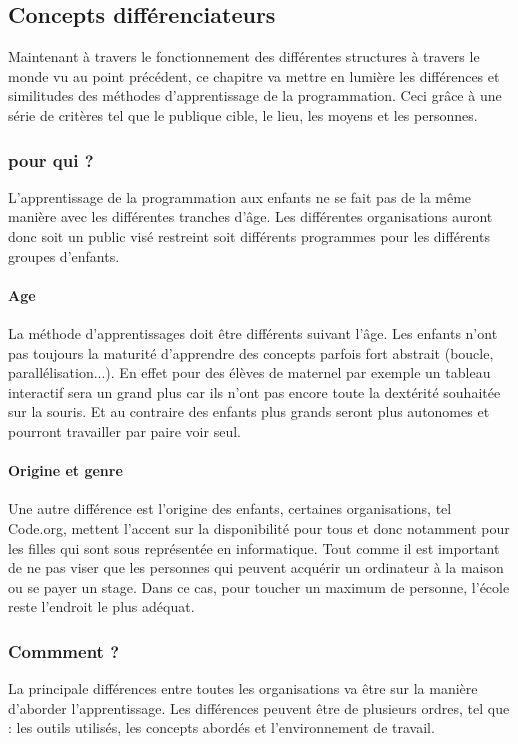 \subsection{Concepts différenciateurs}
\label{concepts}
Maintenant à travers le fonctionnement des  différentes structures à travers le monde vu au point précédent, ce chapitre va mettre en lumière les différences et similitudes des méthodes d'apprentissage de la programmation. Ceci grâce à une série de critères tel que le publique cible, le lieu, les moyens et les personnes.
\subsubsection{pour qui ?}
L'apprentissage de la programmation aux enfants ne se fait pas de la même manière avec les différentes tranches d'âge. Les différentes organisations auront donc soit un public visé restreint soit différents programmes pour les différents groupes d'enfants. 

\paragraph{Age}
La méthode d'apprentissages doit être différents suivant l'âge. Les enfants n'ont pas toujours la maturité d'apprendre des concepts parfois fort abstrait (boucle, parallélisation...). En effet pour des élèves de maternel par exemple un tableau interactif sera un grand plus car ils n'ont pas encore toute la dextérité souhaitée sur la souris. Et au contraire des enfants plus grands seront plus autonomes et pourront travailler par paire voir seul.

\paragraph{Origine et genre}
Une autre différence est l'origine des enfants, certaines organisations, tel Code.org, mettent l'accent sur la disponibilité pour tous et donc notamment pour les filles qui sont sous représentée en informatique. Tout comme il est important de ne pas viser que les personnes qui peuvent acquérir un ordinateur à la maison ou se payer un stage. Dans ce cas, pour toucher un maximum de personne, l'école reste l'endroit le plus adéquat.

\subsubsection{Commment ?}
La principale différences entre toutes les organisations va être sur la manière d'aborder l'apprentissage. Les différences peuvent être de plusieurs ordres, tel que : les outils utilisés, les concepts abordés et l'environnement de travail.


